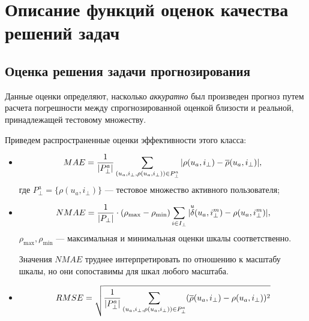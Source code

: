 \section{Описание функций оценок качества решений задач} \label{def-eval}

\subsection{Оценка решения задачи прогнозирования}
Данные оценки определяют, насколько {\it аккуратно} был произведен прогноз путем
расчета погрешности между спрогнозированной оценкой близости и реальной,
принадлежащей тестовому множеству.

Приведем распространенные оценки эффективности этого класса:
\begin{itemize}
\item
  \begin{equation}
	  MAE = \frac{1}{|P^a_{\bot}|} \sum \limits_{(u_a, i_{\bot}, \rho(u_a,
	  i_{\bot})) \in P^a_{\bot}} |\rho(u_a, i_{\bot})
	  - \overline{\rho}(u_a, i_{\bot})|,
  \end{equation}
		где $P^a_{\bot} = \{\rho(u_a, i_{\bot})\}$ --- тестовое множество
		активного пользователя;
\item
  \begin{equation}
	  \label{nmae}
	  NMAE = \frac{1}{|P_{\bot}|} \cdot (\rho_{\max} - \rho_{\min})
	  \sum \limits_{i \in I_{\bot}} |{\overset{u}{\mathcal{\delta}}}(u_a, i^m_{\bot}) - \rho(u_a, i^m_{\bot})|,
  \end{equation}
$\rho_{\max}, \rho_{\min}$ --- максимальная и минимальная оценки
шкалы соответственно.

Значения $NMAE$ труднее интерпретировать по отношению к масштабу шкалы,
но они сопоставимы для шкал любого масштаба.
\item
  \begin{equation}
	  RMSE = \sqrt{\frac{1}{|P^a_{\bot}|} \sum \limits_{(u_a, i_{\bot}, \rho(u_a, i_{\bot})) \in P^a_{\bot}}
	  (\overline{\rho}(u_a, i_{\bot}) - \rho(u_a, i_{\bot}))^2}
  \end{equation}
\end{itemize}


